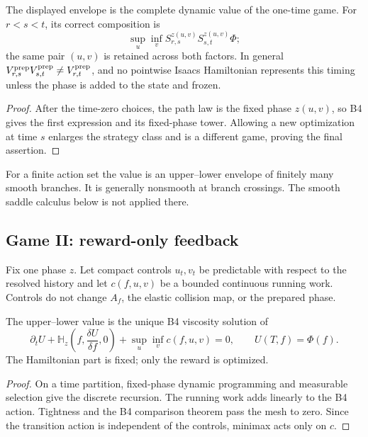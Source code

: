 \begin{theorem}
\label{thm:r3-c1-prep}
The displayed envelope is the complete dynamic value of the one-time game.
For \(r<s<t\), its correct composition is
\[
 \sup_u\inf_v
 S_{r,s}^{z(u,v)}S_{s,t}^{z(u,v)}\Phi;
\]
the same pair \((u,v)\) is retained across both factors.  In general
\(V_{r,s}^{\rm prep}V_{s,t}^{\rm prep}\ne V_{r,t}^{\rm prep}\), and no
pointwise Isaacs Hamiltonian represents this timing unless the phase is added
to the state and frozen.
\end{theorem}

\begin{proof}
After the time-zero choices, the path law is the fixed phase
\(z(u,v)\), so B4 gives the first expression and its fixed-phase tower.
Allowing a new optimization at time \(s\) enlarges the strategy class and is a
different game, proving the final assertion.
\end{proof}

For a finite action set the value is an upper--lower envelope of finitely many
smooth branches.  It is generally nonsmooth at branch crossings.  The smooth
saddle calculus below is not applied there.

\subsection{Game II: reward-only feedback}

Fix one phase \(z\).  Let compact controls \(u_t,v_t\) be predictable with
respect to the resolved history and let \(c(f,u,v)\) be a bounded continuous
running work.  Controls do not change \(A_f\), the elastic collision map, or
the prepared phase.

\begin{theorem}
\label{thm:r3-c1-reward}
The upper--lower value is the unique B4 viscosity solution of
\[
 \partial_tU+\mathbb H_z\left(f,\frac{\delta U}{\delta f},0\right)
 +\sup_u\inf_v c(f,u,v)=0,
 \qquad U(T,f)=\Phi(f).
\]
The Hamiltonian part is fixed; only the reward is optimized.
\end{theorem}

\begin{proof}
On a time partition, fixed-phase dynamic programming and measurable selection
give the discrete recursion.  The running work adds linearly to the B4 action.
Tightness and the B4 comparison theorem pass the mesh to zero.  Since the
transition action is independent of the controls, minimax acts only on
\(c\).
\end{proof}

